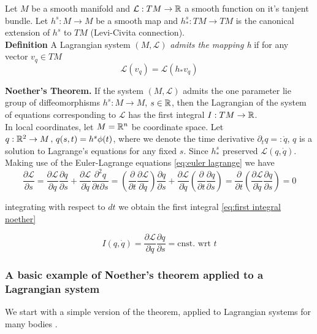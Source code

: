 \documentclass[12pt]{article}
\begin{document}
Let $M$ be a smooth manifold and $\mathcal L : TM\to \mathbb{R}$ a smooth function on it's tanjent bundle. Let $h^s : M\to M$ be a smooth map and $h^s_* : TM\to TM$ is the canonical extension of $h^s$ to $TM$ (Levi-Civita connection).\\

\textbf{Definition} A Lagrangian system $(M,\mathcal L)$ \textit{admits the mapping h} if for any vector $v_q\in TM$
$$\mathcal L(v_q) = \mathcal L(h_*v_q)$$

\textbf{Noether's Theorem.} If the system $(M,\mathcal L)$ admits the one parameter lie group of diffeomorphisms $h^s : M\to M$, $s\in \mathbb{R}$, then the Lagrangian of the system of equations corresponding to $\mathcal L$ has the first integral $I : TM\to \mathbb{R}$. \\

In local coordinates, let $M = \mathbb{R}^n$ be coordinate space. Let $q : \mathbb{R}^2\to M\,,\,q(s,t) = h^s\phi(t)$, where we denote the time derivative $\partial_t q =: \dot q$, $q$ is a solution to Lagrange's equations for any fixed $s$. Since $h^s_*$ preserved $\mathcal L(q,\dot q)$. Making use of the Euler-Lagrange equations \eqref{eq:euler lagrange} we have 
\begin{equation}\label{eq:noether derivaiton}
\frac{\partial \mathcal L}{\partial s} = \frac{\partial \mathcal L}{\partial q}\frac{\partial q}{\partial s} + \frac{\partial \mathcal L}{\partial \dot q}\frac{\partial^2 q}{\partial t\partial s} = 
\left(\frac{\partial}{\partial t} \frac{\partial \mathcal L}{\partial \dot q}\right) \frac{\partial q}{\partial s} + \frac{\partial \mathcal L}{\partial \dot q}\left( \frac{\partial }{\partial t}\frac{\partial q}{\partial s} \right) 
= 
\frac{\partial}{\partial t}\left( \frac{\partial \mathcal L}{\partial \dot q}\frac{\partial q}{\partial s} \right) = 0
\end{equation}

integrating with respect to $dt$ we obtain the first integral \eqref{eq:first integral noether}

\begin{equation}\label{eq:first integral noether}
    I(q,\dot q) = \frac{\partial \mathcal L}{\partial\dot q}\frac{\partial q}{\partial s} = \text{cnst. wrt } t
\end{equation}

\subsubsection{A basic example of Noether's theorem applied to a Lagrangian system}
We start with a simple version of the theorem, applied to Lagrangian systems for many bodies \cite{Morin}.
\end{document}
